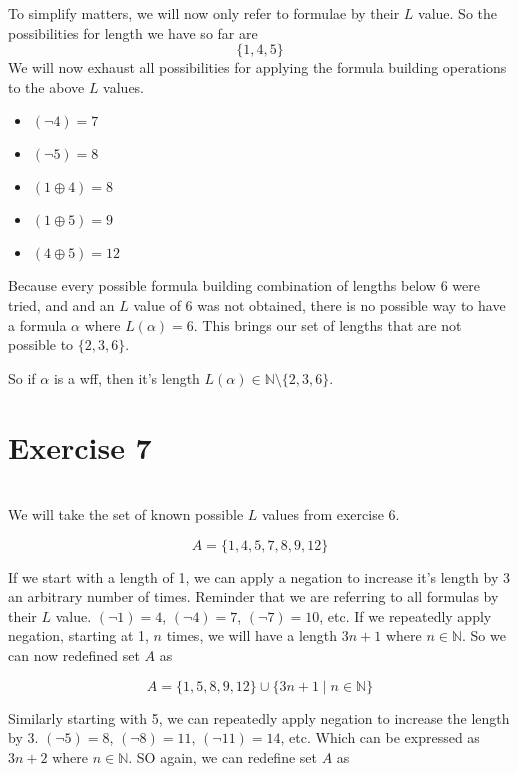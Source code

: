 \documentclass[12pt]{article}
\begin{document}
To simplify matters, we will now only refer to formulae by their $L$ value. So the possibilities for length we have so far are
\[\{1, 4, 5\}\]
We will now exhaust all possibilities for applying the formula building operations to the above $L$ values. 

\begin{itemize}
    \item $(\lnot 4) = 7$
    \item $(\lnot 5) = 8$
    \item $(1 \oplus 4) = 8$
    \item $(1 \oplus 5) = 9$
    \item $(4 \oplus 5) = 12$
\end{itemize}

Because every possible formula building combination of lengths below 6 were tried, and and an $L$ value of 6 was not obtained, there is no possible way to have a formula $\alpha$ where $L(\alpha)=6$. This brings our set of lengths that are not possible to $\{2, 3, 6\}$.

So if $\alpha$ is a wff, then it's length $L(\alpha) \in \mathbb{N} \setminus \{2, 3, 6\}$.


\newpage
\section*{Exercise 7}
\\

We will take the set of known possible $L$ values from exercise 6.

\[A = \{1, 4, 5, 7, 8, 9, 12\}\]

If we start with a length of 1, we can apply a negation to increase it's length by 3 an arbitrary number of times. Reminder that we are referring to all formulas by their $L$ value. $(\lnot 1) = 4$, $(\lnot 4) = 7$, $(\lnot 7) = 10$, etc. If we repeatedly apply negation, starting at 1, $n$ times, we will have a length $3n+1$ where $n \in \mathbb{N}$. So we can now redefined set $A$ as

\[A = \{1, 5, 8, 9, 12\} \cup \{3n+1 \mid n \in \mathbb{N}\}\]

Similarly starting with 5, we can repeatedly apply negation to increase the length by 3. $(\lnot 5) = 8$, $(\lnot 8) = 11$, $(\lnot 11) = 14$, etc. Which can be expressed as $3n+2$ where $n \in \mathbb{N}$. SO again, we can redefine set $A$ as
\end{document}
